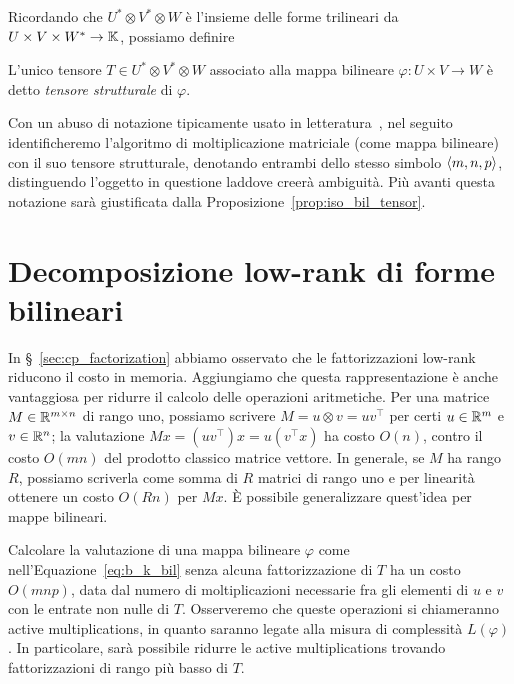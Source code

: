 Ricordando che $ U^* \otimes V^* \otimes W $ è l'insieme delle forme trilineari da $ U \times V
	\times W^* \to \mathbb{K} $, possiamo definire
\begin{definition}
	L'unico tensore $ T \in U^* \otimes V^* \otimes W$ associato alla mappa bilineare $ \varphi : U
		\times V \to W $ è detto \emph{tensore strutturale} di $ \varphi $.
\end{definition}

\begin{warning}
	Con un abuso di notazione tipicamente usato in letteratura~\cite{landsberg2011tensors,
		landsberg2015geometry, burgisser2013algebraic}, nel seguito identificheremo l'algoritmo
	di moltiplicazione matriciale (come mappa bilineare) con il suo tensore strutturale, denotando
	entrambi dello stesso simbolo $ \angb{m,n,p} $, distinguendo l'oggetto in questione laddove
	creerà ambiguità. Più avanti questa notazione sarà giustificata dalla
	Proposizione~\ref{prop:iso_bil_tensor}.
\end{warning}

\section{Decomposizione low-rank di forme bilineari}

In \S~\ref{sec:cp_factorization} abbiamo osservato che le fattorizzazioni low-rank riducono il costo
in memoria. Aggiungiamo che questa rappresentazione è anche vantaggiosa per ridurre il
calcolo delle operazioni aritmetiche. Per una matrice $ M \in \mathbb{R}^{m\times n} $ di rango uno,
possiamo scrivere $ M = u \otimes v = uv^{\top} $ per certi $ u \in \mathbb{R}^m $ e $ v \in \mathbb{R}^n $; la valutazione $ Mx =
	(uv^{\top})x = u(v^{\top}x) $ ha costo $ O(n) $, contro il costo $ O(mn) $ del prodotto classico
matrice vettore. In generale, se $ M $ ha rango $ R $, possiamo scriverla come somma di $ R $
matrici di rango uno e per linearità
ottenere un costo $ O(Rn) $ per $ Mx $. È possibile generalizzare quest'idea per mappe bilineari.

Calcolare la valutazione di una mappa bilineare $ \varphi $ come nell'Equazione~\eqref{eq:b_k_bil}
senza alcuna fattorizzazione di $ T $ ha un costo $
	O(mnp) $, data dal numero di
moltiplicazioni necessarie fra gli elementi di $ u $ e $ v $ con le entrate non nulle di $ T $.
Osserveremo che queste operazioni si chiameranno active
multiplications, in quanto saranno legate alla misura di complessità $ L(\varphi) $. In particolare, sarà possibile ridurre le active multiplications
trovando fattorizzazioni di rango più basso di $ T $.


